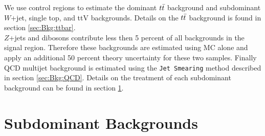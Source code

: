 
\indent We use control regions to estimate the dominant $t\bar{t}$ background and subdominant $W$+jet, single top, and ttV backgrounds.  Details on the $t\bar{t}$ background is found in section \ref{sec:Bkg:ttbar}.  \\

\indent $Z$+jets and dibosons contribute less then 5 percent of all backgrounds in the signal region.  Therefore these backgrounds are estimated using MC alone and apply an additional 50 percent theory uncertainty for these two samples.  Finally QCD multijet background is estimated using the {\tt Jet Smearing} method described in section \ref{sec:Bkg:QCD}.  Details on the treatment of each subdominant background can be found in section \ref{sec:Bkg:sub}.\\





\section{Subdominant Backgrounds}
\label{sec:Bkg:sub}






